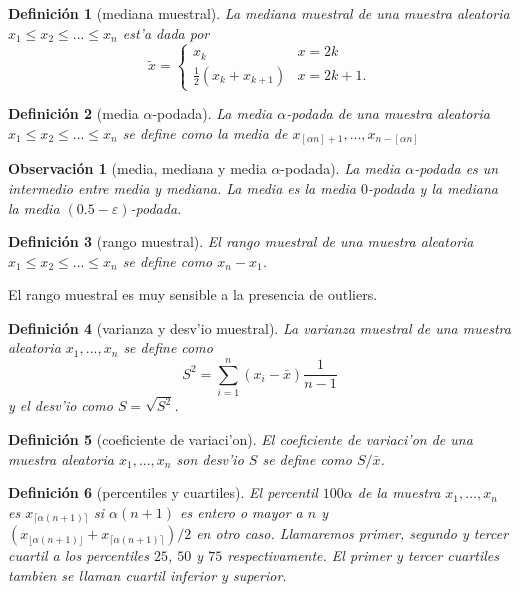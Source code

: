 \documentclass[a4paper,spanish]{article}
\newcommand{\eps}[0]{\varepsilon}
\newtheorem{defi}{Definici\'on}
\newtheorem{obs}{Observaci\'on}
\begin{document}
\begin{defi}[mediana muestral]
La \emph{mediana muestral} de una muestra aleatoria $x_1 \leq x_2 \leq ...
\leq x_n$ est'a dada por
$$\tilde{x} = 
	\begin{cases}
	x_k & x = 2k \\
	\frac{1}{2}(x_k+x_{k+1}) & x = 2k+1.
	\end{cases}$$
\end{defi}

\begin{defi}[media $\alpha$-podada]
La \emph{media $\alpha$-podada} de una muestra aleatoria $x_1 \leq x_2 \leq ...
\leq x_n$ se define como la media de $x_{[\alpha n] + 1},...,x_{n-[\alpha n]}$
\end{defi}

\begin{obs}[media, mediana y media $\alpha$-podada]
La media $\alpha$-podada es un intermedio entre media y mediana. La media es
la media $0$-podada y la mediana la media $(0.5-\eps)$-podada.
\end{obs}

\begin{defi}[rango muestral]
El \emph{rango muestral} de una muestra aleatoria $x_1 \leq x_2 \leq ...
\leq x_n$ se define como $x_n - x_1$.
\end{defi}
El rango muestral es muy sensible a la presencia de outliers.


\begin{defi}[varianza y desv'io muestral]
La \emph{varianza muestral} de una muestra aleatoria $x_1,...,x_n$ se define
como 
$$S^2 = \sum_{i=1}^n (x_i-\bar{x}) \frac{1}{n-1}$$
y el desv'io como $S = \sqrt{S^2}$.
\end{defi}

\begin{defi}[coeficiente de variaci'on]
El \emph{coeficiente de variaci'on} de una muestra aleatoria $x_1,...,x_n$
son desv'io $S$ se define como $S / \bar{x}$.
\end{defi}

\begin{defi}[percentiles y cuartiles]
El \emph{percentil} $100 \alpha$ de la muestra $x_1,...,x_n$ es 
$x_{\lceil\alpha (n+1)\rceil}$ si $\alpha (n+1)$ es entero o mayor a $n$ y 
$(x_{\lfloor\alpha (n+1)\rfloor}+x_{\lceil\alpha (n+1)\rceil})/2$ en otro caso.
Llamaremos primer, segundo y tercer \emph{cuartil} a los percentiles $25$, 
$50$ y $75$ respectivamente. El primer y tercer cuartiles tambien se llaman
cuartil inferior y superior.
\end{defi}
\end{document}
